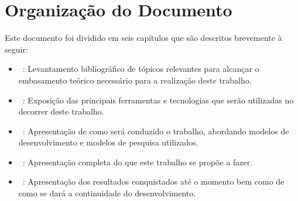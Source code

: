 \section{Organização do Documento}

Este documento foi dividido em seis capítulos que são descritos brevemente à seguir:

\begin{itemize}
	\item ~: Levantamento bibliográfico de tópicos relevantes para alcançar o embasamento teórico necessário para a realização deste trabalho.
	\item ~: Exposição das principais ferramentas e tecnologias que serão utilizadas no decorrer deste trabalho.
	\item ~: Apresentação de como será conduzido o trabalho, abordando modelos de desenvolvimento e modelos de pesquisa utilizados.
	\item ~: Apresentação completa do que este trabalho se propõe a fazer.
	\item ~: Apresentação dos resultados conquistados até o momento bem como de como se dará a continuidade do desenvolvimento.
\end{itemize}
